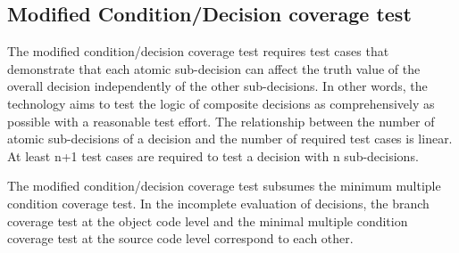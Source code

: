 \documentclass[master,english,smartquotes,apa]{hgbthesis}
\begin{document}
	\subsection{Modified Condition/Decision coverage test}

	The modified condition/decision coverage test requires test cases that demonstrate that each atomic sub-decision can affect the truth value of the overall decision independently of the other sub-decisions. In other words, the technology aims to test the logic of composite decisions as comprehensively as possible with a reasonable test effort. The relationship between the number of atomic sub-decisions of a decision and the number of required test cases is linear. At least n+1 test cases are required to test a decision with n sub-decisions.



	The modified condition/decision coverage test subsumes the minimum multiple condition coverage test. In the incomplete evaluation of decisions, the branch coverage test at the object code level and the minimal multiple condition coverage test at the source code level correspond to each other.


\end{document}
